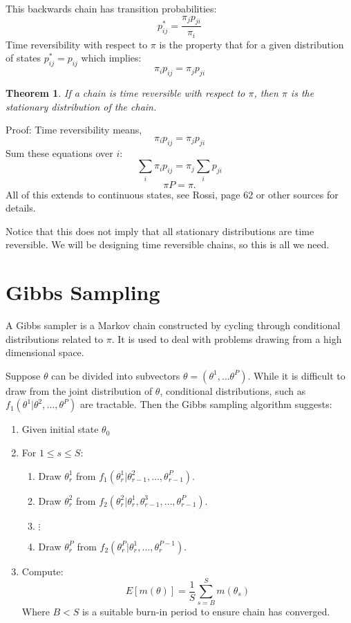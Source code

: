 \documentclass[twoside]{article}
\newcounter{lecnum}
\newtheorem{theorem}{Theorem}[lecnum]
\begin{document}
This backwards chain has transition probabilities: 
$$p^*_{ij} = \frac{\pi_j p_{ji}}{\pi_i}$$
Time reversibility with respect to $\pi$ is the property that for a given distribution of states $p^*_{ij} = p_{ij}$ which implies: 
$$\pi_i p_{ij} = \pi_j p_{ji}$$

\begin{theorem}
If a chain is time reversible with respect to $\pi$, then $\pi$ is the stationary distribution of the chain. 
\end{theorem}

Proof: 
Time reversibility means,
$$\pi_i p_{ij} = \pi_j p_{ji}$$
Sum these equations over $i$:
$$\sum_i \pi_i p_{ij} = \pi_j \sum_i p_{ji}$$
$$ \pi P = \pi.$$ 
All of this extends to continuous states, see Rossi, page 62 or other sources for details. 

Notice that this does not imply that all stationary distributions are time reversible. We will be designing time reversible chains, so this is all we need. 

\section{Gibbs Sampling}

A Gibbs sampler is a Markov chain constructed by cycling through conditional distributions related to $\pi$. It is used to deal with problems drawing from 
a high dimensional space. 

Suppose $\theta$ can be divided into subvectors $\theta = (\theta^1, \ldots \theta^P)$. While it is difficult to draw from 
the joint distribution of $\theta$, conditional distributions, such as $f_1(\theta^1| \theta^2, \ldots, \theta^P)$ are tractable. 
Then the Gibbs sampling algorithm suggests: 

\begin{enumerate}
\item Given initial state $\theta_0$
\item For $1 \leq s \leq S$:
\begin{enumerate}
\item Draw $\theta^1_r$ from $f_1( \theta^1_r |  \theta^2_{r-1}, \ldots, \theta^P_{r-1})$. 
\item Draw $\theta^2_r$ from $f_2( \theta^2_r |  \theta^1_r, \theta^3_{r-1}, \ldots, \theta^P_{r-1})$. 
\item $\vdots$
\item Draw $\theta^P_r$ from $f_2( \theta^P_r |  \theta^1_r, \ldots, \theta^{P-1}_{r})$.
\end{enumerate}
\item Compute:
$$ E[m(\theta)] = \frac{1}{S} \sum_{s = B}^S m(\theta_s) $$
Where $B < S$ is a suitable burn-in period to ensure chain has converged. 
\end{enumerate}
\end{document}
